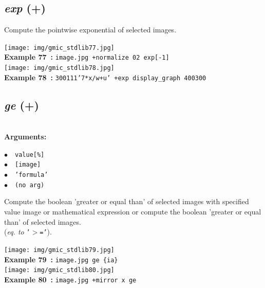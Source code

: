 \documentclass[a4paper,10.5pt,twoside]{book}
\def\comma{\discretionary{,}{}{,}}
\newcommand{\Cb}[1]{\textcolor{cb}{#1}}
\begin{document}
\subsection{\emph{exp} (+)}\vspace*{-0.7em}
Compute the pointwise exponential of selected images.
\begin{center}\texttt{[image: img/gmic\_stdlib77.jpg]}\\
{\footnotesize \textbf{Example 77~:} \texttt{image.jpg +normalize 0{\comma}2 exp[-1]}}
\\\texttt{[image: img/gmic\_stdlib78.jpg]}\\
{\footnotesize \textbf{Example 78~:} \texttt{300{\comma}1{\comma}1{\comma}1{\comma}'7*x/w+u' +exp display\_graph 400{\comma}300}}
\end{center}

\subsection{\emph{ge} (+)}\vspace*{-0.7em}
~\\\textbf{\Cb{Arguments: }}\begin{flushleft}
{\small \Cb{\hspace*{0.5cm}$\bullet$~~\texttt{value[\%]}}}~~~\\
{\small \Cb{\hspace*{0.5cm}$\bullet$~~\texttt{[image]}}}~~~\\
{\small \Cb{\hspace*{0.5cm}$\bullet$~~\texttt{'formula'}}}~~~\\
{\small \Cb{\hspace*{0.5cm}$\bullet$~~\texttt{(no arg)}}}\end{flushleft}
Compute the boolean 'greater or equal than' of selected images with specified value{\comma} image
or mathematical expression{\comma} or compute the boolean 'greater or equal than' of selected images.
~\\(\emph{eq. to} {\small \texttt{'$>$='}}).
\begin{center}\texttt{[image: img/gmic\_stdlib79.jpg]}\\
{\footnotesize \textbf{Example 79~:} \texttt{image.jpg ge \{ia\}}}
\\\texttt{[image: img/gmic\_stdlib80.jpg]}\\
{\footnotesize \textbf{Example 80~:} \texttt{image.jpg +mirror x ge}}
\end{center}
\end{document}
